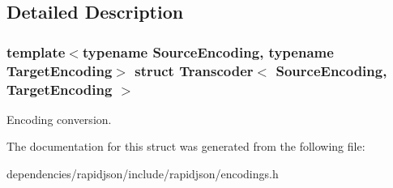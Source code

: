 \subsection{Detailed Description}
\subsubsection*{template$<$typename Source\+Encoding, typename Target\+Encoding$>$\newline
struct Transcoder$<$ Source\+Encoding, Target\+Encoding $>$}

Encoding conversion. 

The documentation for this struct was generated from the following file\+:\begin{DoxyCompactItemize}
\item 
dependencies/rapidjson/include/rapidjson/encodings.\+h\end{DoxyCompactItemize}
